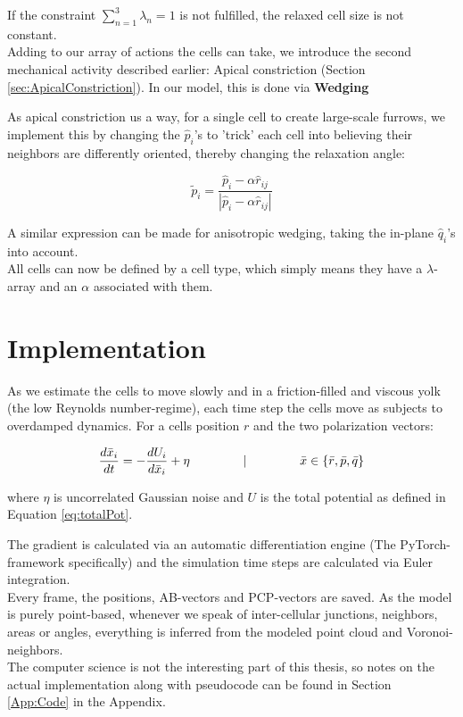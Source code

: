 If the constraint $\sum_{n=1}^{3}\lambda_n=1$ is not fulfilled, the relaxed cell size is not constant. \\

Adding to our array of actions the cells can take, we introduce the second mechanical activity described earlier: Apical constriction (Section \ref{sec:ApicalConstriction}). In our model, this is done via \textbf{Wedging}

As apical constriction us a way, for a single cell to create large-scale furrows, we implement this by changing the $\hat{p}_i$'s to 'trick' each cell into believing their neighbors are differently oriented, thereby changing the relaxation angle:

\begin{equation}
    \tilde{{p}}_i = \frac{\hat{p}_i-\alpha \widehat{{r}}_{i j}}{|\hat{p}_i-\alpha \widehat{{r}}_{i j}|} 
\end{equation}

A similar expression can be made for anisotropic wedging, taking the in-plane $\hat{q}_i$'s into account.\\

All cells can now be defined by a cell type, which simply means they have a $\lambda$-array and an $\alpha$ associated with them.\\


\section{Implementation}
As we estimate the cells to move slowly and in a friction-filled and viscous yolk (the low Reynolds number-regime), each time step the cells move as subjects to overdamped dynamics. For a cells position $r$ and the two polarization vectors:

\begin{equation}
    \frac{d \bar{x}_i}{d t}=-\frac{d U_i}{d \bar{x}_i}+\eta \hspace{1.5cm}|\hspace{1.5cm}  \bar{x} \in \{\bar{r}, \bar{p}, \bar{q}\}
\end{equation}

where $\eta$ is uncorrelated Gaussian noise and $U$ is the total potential as defined in Equation \ref{eq:totalPot}.

The gradient is calculated via an automatic differentiation engine (The PyTorch-framework specifically) and the simulation time steps are calculated via Euler integration.\\

Every frame, the positions, AB-vectors and PCP-vectors are saved. As the model is purely point-based, whenever we speak of inter-cellular junctions, neighbors, areas or angles, everything is inferred from the modeled point cloud and Voronoi-neighbors. \\

The computer science is not the interesting part of this thesis, so notes on the actual implementation along with pseudocode can be found in Section \ref{App:Code} in the Appendix.

